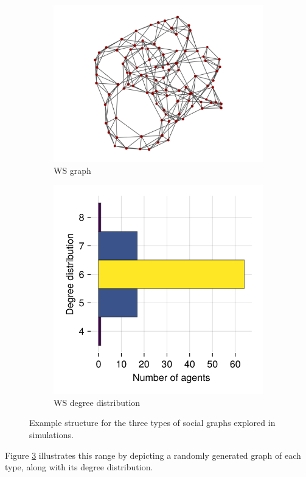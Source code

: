 \documentclass[]{article}
\begin{document}
\begin{figure}
		\begin{subfigure}{0.45\textwidth}
		\centering
		\includegraphics[width=0.9\linewidth]{../plots/g_wattsstrogatz_n100_k3_p01_s33} 
		\caption{WS graph}  \label{fig:subim31}
	\end{subfigure}
	\hfill
	\begin{subfigure}{0.45\textwidth}
		\centering
		\includegraphics[width=0.7\linewidth]{../plots/g_wattsstrogatz_hist_degree_n100_k3_p01_s33}
		\caption{WS degree distribution} \label{fig:subim32}
	\end{subfigure}
	
	\caption{Example structure for the three types of social graphs explored in simulations.}
	\label{fig:graphtypes}
\end{figure}

Figure \ref{fig:graphtypes} illustrates this range by depicting a randomly generated graph of each type, along with its degree distribution.
\end{document}
